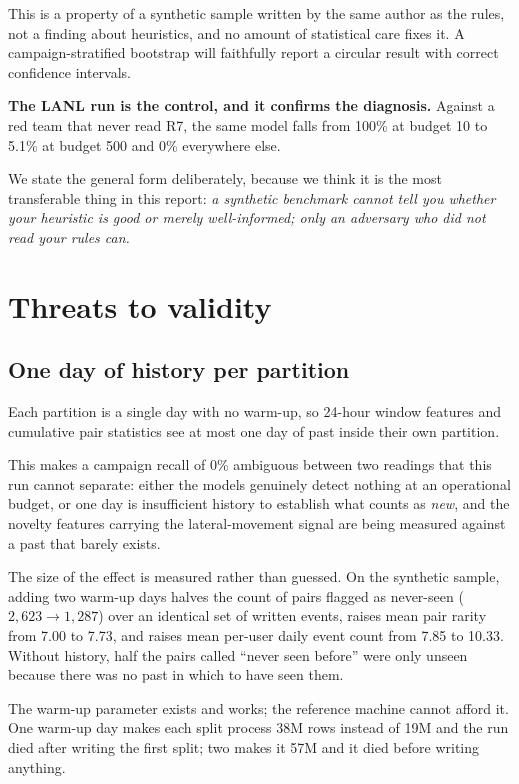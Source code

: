 \documentclass[11pt,a4paper]{article}
\begin{document}
This is a property of a synthetic sample written by the same author as the rules,
not a finding about heuristics, and no amount of statistical care fixes it. A
campaign-stratified bootstrap will faithfully report a circular result with
correct confidence intervals.

\textbf{The LANL run is the control, and it confirms the diagnosis.} Against a
red team that never read R7, the same model falls from 100\% at budget 10 to
5.1\% at budget 500 and 0\% everywhere else.

We state the general form deliberately, because we think it is the most
transferable thing in this report: \emph{a synthetic benchmark cannot tell you
whether your heuristic is good or merely well-informed; only an adversary who did
not read your rules can.}

\section{Threats to validity}
\label{sec:threats}

\subsection{One day of history per partition}

Each partition is a single day with no warm-up, so 24-hour window features and
cumulative pair statistics see at most one day of past inside their own
partition.

This makes a campaign recall of 0\% ambiguous between two readings that this run
cannot separate: either the models genuinely detect nothing at an operational
budget, or one day is insufficient history to establish what counts as
\emph{new}, and the novelty features carrying the lateral-movement signal are
being measured against a past that barely exists.

The size of the effect is measured rather than guessed. On the synthetic sample,
adding two warm-up days halves the count of pairs flagged as never-seen
($2{,}623 \to 1{,}287$) over an identical set of written events, raises mean pair
rarity from 7.00 to 7.73, and raises mean per-user daily event count from 7.85 to
10.33. Without history, half the pairs called ``never seen before'' were only
unseen because there was no past in which to have seen them.

The warm-up parameter exists and works; the reference machine cannot afford it.
One warm-up day makes each split process 38M rows instead of 19M and the run died
after writing the first split; two makes it 57M and it died before writing
anything.
\end{document}
